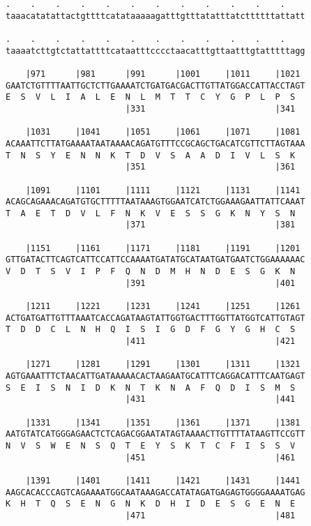 \documentclass{article}
\begin{document}
\begin{Verbatim}
.    .    .    .    .    .    .    .    .    .    .    .    
taaacatatattactgttttcatataaaaagatttgtttatatttatcttttttattatt
                                                            
.    .    .    .    .    .    .    .    .    .    .    .    
taaaatcttgtctattattttcataatttcccctaacatttgttaatttgtatttttagg
                                                            
    |971      |981      |991      |1001     |1011     |1021 
GAATCTGTTTTAATTGCTCTTGAAAATCTGATGACGACTTGTTATGGACCATTACCTAGT
E  S  V  L  I  A  L  E  N  L  M  T  T  C  Y  G  P  L  P  S  
                        |331                          |341  
  
    |1031     |1041     |1051     |1061     |1071     |1081 
ACAAATTCTTATGAAAATAATAAAACAGATGTTTCCGCAGCTGACATCGTTCTTAGTAAA
T  N  S  Y  E  N  N  K  T  D  V  S  A  A  D  I  V  L  S  K  
                        |351                          |361  
  
    |1091     |1101     |1111     |1121     |1131     |1141 
ACAGCAGAAACAGATGTGCTTTTTAATAAAGTGGAATCATCTGGAAAGAATTATTCAAAT
T  A  E  T  D  V  L  F  N  K  V  E  S  S  G  K  N  Y  S  N  
                        |371                          |381  
  
    |1151     |1161     |1171     |1181     |1191     |1201 
GTTGATACTTCAGTCATTCCATTCCAAAATGATATGCATAATGATGAATCTGGAAAAAAC
V  D  T  S  V  I  P  F  Q  N  D  M  H  N  D  E  S  G  K  N  
                        |391                          |401  
  
    |1211     |1221     |1231     |1241     |1251     |1261 
ACTGATGATTGTTTAAATCACCAGATAAGTATTGGTGACTTTGGTTATGGTCATTGTAGT
T  D  D  C  L  N  H  Q  I  S  I  G  D  F  G  Y  G  H  C  S  
                        |411                          |421  
  
    |1271     |1281     |1291     |1301     |1311     |1321 
AGTGAAATTTCTAACATTGATAAAAACACTAAGAATGCATTTCAGGACATTTCAATGAGT
S  E  I  S  N  I  D  K  N  T  K  N  A  F  Q  D  I  S  M  S  
                        |431                          |441  
  
    |1331     |1341     |1351     |1361     |1371     |1381 
AATGTATCATGGGAGAACTCTCAGACGGAATATAGTAAAACTTGTTTTATAAGTTCCGTT
N  V  S  W  E  N  S  Q  T  E  Y  S  K  T  C  F  I  S  S  V  
                        |451                          |461  
  
    |1391     |1401     |1411     |1421     |1431     |1441 
AAGCACACCCAGTCAGAAAATGGCAATAAAGACCATATAGATGAGAGTGGGGAAAATGAG
K  H  T  Q  S  E  N  G  N  K  D  H  I  D  E  S  G  E  N  E  
                        |471                          |481  
  

\end{Verbatim}
\end{document}
